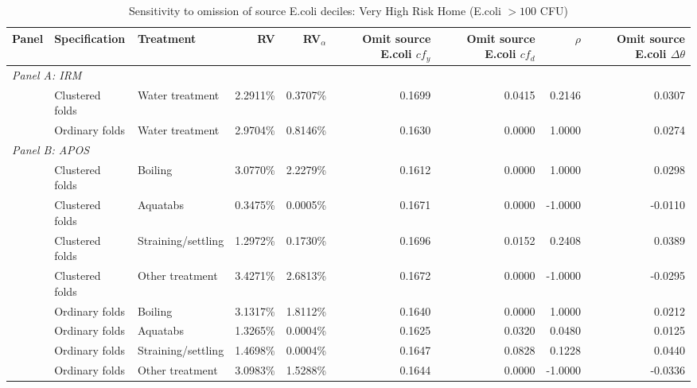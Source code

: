 \begin{landscape}
\begin{table}[p]
\centering
\caption{Sensitivity to omission of source E.coli deciles: Very High Risk Home (E.coli $>100$ CFU)}
\label{tab:table_sensitivity_benchmark-VeryHighRiskHome}
\scriptsize
\setlength{\tabcolsep}{5pt}
\renewcommand{\arraystretch}{0.92}
\begin{adjustbox}{max width=\linewidth, center}
\begin{tabular}{lllrrrrrr}
\toprule
Panel & Specification & Treatment & RV & RV$_\alpha$ & \shortstack{Omit source E.coli\\$cf_y$} & \shortstack{Omit source E.coli\\$cf_d$} & $\rho$ & \shortstack{Omit source E.coli\\$\Delta\theta$} \\
\midrule
\multicolumn{9}{l}{\textit{Panel A: IRM}} \\
 & Clustered folds & Water treatment & 2.2911\% & 0.3707\% & 0.1699 & 0.0415 & 0.2146 & 0.0307 \\
\addlinespace[3pt]
 & Ordinary folds & Water treatment & 2.9704\% & 0.8146\% & 0.1630 & 0.0000 & 1.0000 & 0.0274 \\
\midrule
\multicolumn{9}{l}{\textit{Panel B: APOS}} \\
 & Clustered folds & Boiling & 3.0770\% & 2.2279\% & 0.1612 & 0.0000 & 1.0000 & 0.0298 \\
 & Clustered folds & Aquatabs & 0.3475\% & 0.0005\% & 0.1671 & 0.0000 & -1.0000 & -0.0110 \\
 & Clustered folds & Straining/settling & 1.2972\% & 0.1730\% & 0.1696 & 0.0152 & 0.2408 & 0.0389 \\
 & Clustered folds & Other treatment & 3.4271\% & 2.6813\% & 0.1672 & 0.0000 & -1.0000 & -0.0295 \\
\addlinespace[3pt]
 & Ordinary folds & Boiling & 3.1317\% & 1.8112\% & 0.1640 & 0.0000 & 1.0000 & 0.0212 \\
 & Ordinary folds & Aquatabs & 1.3265\% & 0.0004\% & 0.1625 & 0.0320 & 0.0480 & 0.0125 \\
 & Ordinary folds & Straining/settling & 1.4698\% & 0.0004\% & 0.1647 & 0.0828 & 0.1228 & 0.0440 \\
 & Ordinary folds & Other treatment & 3.0983\% & 1.5288\% & 0.1644 & 0.0000 & -1.0000 & -0.0336 \\
\bottomrule
\end{tabular}
\end{adjustbox}

\end{table}
\end{landscape}
